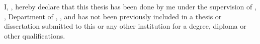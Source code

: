 
I, {\getauthor}, hereby declare that this thesis has been done by me under the supervision of {\supervisor}, {\supervisortitle}, Department of {\supervisordept}, {\Diu}, and has not been previously included in a thesis or dissertation submitted to this or any other institution for a degree, diploma or other qualifications. 
